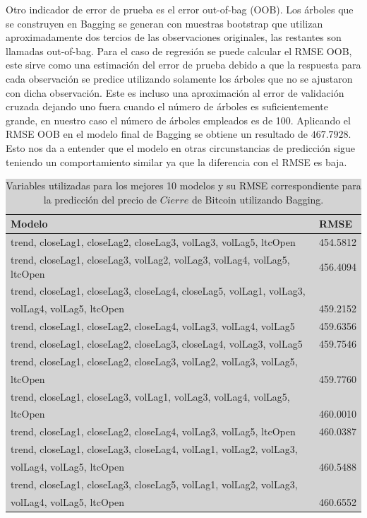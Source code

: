 \documentclass[a4paper,12pt,twocolumn]{article}
\begin{document}
Otro indicador de error de prueba es el error out-of-bag (OOB). Los árboles que se construyen en Bagging se generan con muestras bootstrap que utilizan aproximadamente dos tercios de las observaciones originales, las restantes son llamadas out-of-bag. Para el caso de regresión se puede calcular el RMSE OOB, este sirve como una estimación del error de prueba debido a que la respuesta para cada observación se predice utilizando solamente los árboles que no se ajustaron con dicha observación. Este es incluso una aproximación al error de validación cruzada dejando uno fuera cuando el número de árboles es suficientemente grande, en nuestro caso el número de árboles empleados es de 100. Aplicando el RMSE OOB en el modelo final de Bagging se obtiene un resultado de $467.7928$. Esto nos da a entender que el modelo en otras circunstancias de predicción sigue teniendo un comportamiento similar ya que la diferencia con el RMSE es baja.

\begin{table}[!hbt]
\centering
\caption{Variables utilizadas para los mejores 10 modelos y su RMSE correspondiente para la predicción del precio de $Cierre$ de Bitcoin utilizando Bagging.}
\label{baggingTop10}
\begingroup\setlength{\fboxsep}{0pt}
\colorbox{lightgray}{%
\begin{tabular}{|l|l|}
\hline Modelo & RMSE \\
\hline  trend, closeLag1, closeLag2, closeLag3, volLag3, volLag5, ltcOpen & 454.5812\\
\hline trend, closeLag1, closeLag3, volLag2, volLag3, volLag4, volLag5, ltcOpen & 456.4094 \\
\hline   trend, closeLag1, closeLag3, closeLag4, closeLag5, volLag1, volLag3, \\volLag4, volLag5, ltcOpen& 459.2152 \\
\hline  trend, closeLag1, closeLag2, closeLag4, volLag3, volLag4, volLag5& 459.6356 \\
\hline  trend, closeLag1, closeLag2, closeLag3, closeLag4, volLag3, volLag5& 459.7546\\
\hline trend, closeLag1, closeLag2, closeLag3, volLag2, volLag3, volLag5, \\ ltcOpen & 459.7760\\
\hline trend, closeLag1, closeLag3, volLag1, volLag3, volLag4, volLag5, \\ ltcOpen & 460.0010\\
\hline trend, closeLag1, closeLag2, closeLag4, volLag3, volLag5, ltcOpen & 460.0387\\
\hline trend, closeLag1, closeLag3, closeLag4, volLag1, volLag2, volLag3, \\ volLag4, volLag5, ltcOpen & 460.5488\\
\hline trend, closeLag1, closeLag3, closeLag5, volLag1, volLag2, volLag3, \\ volLag4, volLag5, ltcOpen & 460.6552\\
\hline
\end{tabular}%
}\endgroup
\end{table}
\end{document}
